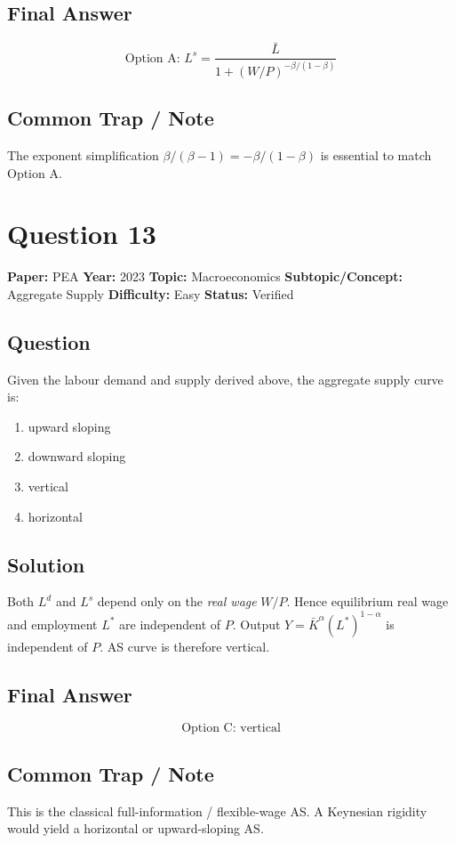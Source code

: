 \documentclass[11pt]{article}
\begin{document}
\subsection*{Final Answer}
\[
\boxed{\text{Option A: } L^s=\dfrac{\bar L}{1+(W/P)^{-\beta/(1-\beta)}}}
\]

\subsection*{Common Trap / Note}
The exponent simplification $\beta/(\beta-1)=-\beta/(1-\beta)$ is essential to match Option A.

\medskip

\section*{Question 13}
\textbf{Paper:} PEA \quad \textbf{Year:} 2023 \quad \textbf{Topic:} Macroeconomics \quad \textbf{Subtopic/Concept:} Aggregate Supply \quad \textbf{Difficulty:} Easy \quad \textbf{Status:} Verified

\subsection*{Question}
Given the labour demand and supply derived above, the aggregate supply curve is:
\begin{enumerate}[label=(\Alph*)]
\item upward sloping \item downward sloping \item vertical \item horizontal
\end{enumerate}

\subsection*{Solution}
Both $L^d$ and $L^s$ depend only on the \emph{real wage} $W/P$. Hence equilibrium real wage and employment $L^*$ are independent of $P$. Output $Y=\bar K^\alpha (L^*)^{1-\alpha}$ is independent of $P$. AS curve is therefore vertical.

\subsection*{Final Answer}
\[
\boxed{\text{Option C: vertical}}
\]

\subsection*{Common Trap / Note}
This is the classical full-information / flexible-wage AS. A Keynesian rigidity would yield a horizontal or upward-sloping AS.
\end{document}
